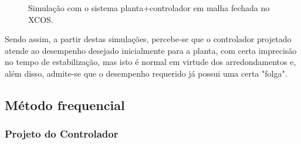 \begin{figure}[H]
\begin{center}
\end{center}
\caption{Simulação com o sistema planta+controlador em malha fechada no XCOS.}
\label{xcos:mfc} 
\end{figure}

Sendo assim, a partir destas simulações, percebe-se que o controlador projetado atende ao desempenho desejado inicialmente para a planta, com certa imprecisão no tempo de estabilização, mas isto é normal em virtude dos arredondamentos e, além disso, admite-se que o desempenho requerido já possui uma certa "folga".

\subsection{Método frequencial}


\subsubsection{Projeto do Controlador}

 
